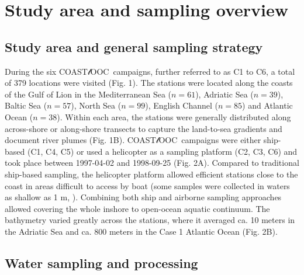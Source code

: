 \documentclass[essd, manuscript]{copernicus}
\newcommand{\coastlooc}{COAST$\mathscr{l}$OOC~\allowbreak}
\begin{document}
\section{Study area and sampling overview}

\subsection{Study area and general sampling strategy}

During the six \coastlooc campaigns, further referred to as C1 to C6, a total of 379 locations were visited (Fig. 1). The stations were located along the coasts of the Gulf of Lion in the Mediterranean Sea ($n = 61$), Adriatic Sea ($n = 39$), Baltic Sea ($n = 57$), North Sea ($n = 99$), English Channel ($n = 85$) and Atlantic Ocean ($n = 38$). Within each area, the stations were generally distributed along across-shore or along-shore transects to capture the land-to-sea gradients and document river plumes (Fig. 1B). \coastlooc campaigns were either ship-based (C1, C4, C5) or used a helicopter as a sampling platform (C2, C3, C6) and took place between 1997-04-02 and 1998-09-25 (Fig. 2A). Compared to traditional ship-based sampling, the helicopter platform allowed efficient stations close to the coast in areas difficult to access by boat (some samples were collected in waters as shallow as 1 m, \citealt{Babin2003b}). Combining both ship and airborne sampling approaches allowed covering the whole inshore to open-ocean aquatic continuum. The bathymetry \citep{GEBCO2021} varied greatly across the stations, where it averaged ca. 10 meters in the Adriatic Sea and ca. 800 meters in the Case 1 Atlantic Ocean (Fig. 2B).

\subsection{Water sampling and processing}
\end{document}
